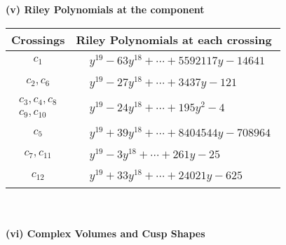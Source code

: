 \documentclass[1p]{elsarticle_modified}
\theoremstyle{definition}
\begin{document}
\newpage\renewcommand{\arraystretch}{1}
\flushleft \textbf{(v) Riley Polynomials at the component}\newline \\
\begin{tabular}{m{50pt}|m{274pt}}
Crossings & \hspace{64pt}Riley Polynomials at each crossing \\
\hline $$\begin{aligned}c_{1}\end{aligned}$$&$\begin{aligned}
&y^{19}-63 y^{18}+\cdots+5592117 y-14641
\end{aligned}$\\
\hline $$\begin{aligned}c_{2},c_{6}\end{aligned}$$&$\begin{aligned}
&y^{19}-27 y^{18}+\cdots+3437 y-121
\end{aligned}$\\
\hline $$\begin{aligned}c_{3},c_{4},c_{8}\\c_{9},c_{10}\end{aligned}$$&$\begin{aligned}
&y^{19}-24 y^{18}+\cdots+195 y^2-4
\end{aligned}$\\
\hline $$\begin{aligned}c_{5}\end{aligned}$$&$\begin{aligned}
&y^{19}+39 y^{18}+\cdots+8404544 y-708964
\end{aligned}$\\
\hline $$\begin{aligned}c_{7},c_{11}\end{aligned}$$&$\begin{aligned}
&y^{19}-3 y^{18}+\cdots+261 y-25
\end{aligned}$\\
\hline $$\begin{aligned}c_{12}\end{aligned}$$&$\begin{aligned}
&y^{19}+33 y^{18}+\cdots+24021 y-625
\end{aligned}$\\
\hline
\end{tabular}\\~\\
\newpage\flushleft \textbf{(vi) Complex Volumes and Cusp Shapes}
\end{document}
